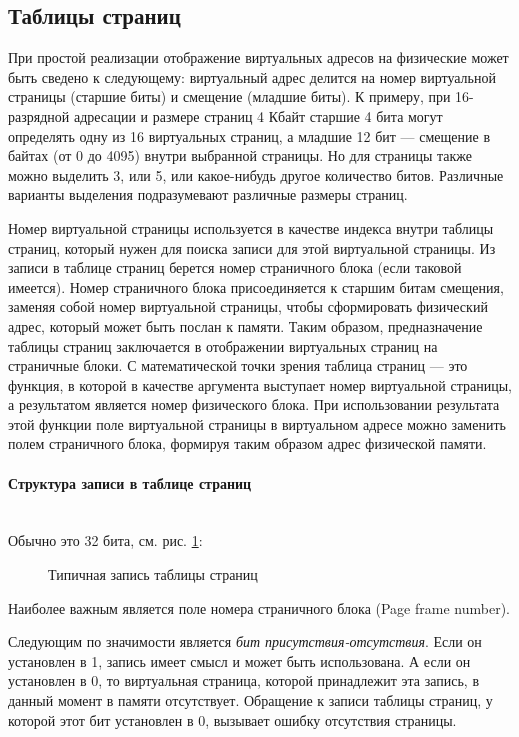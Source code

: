 \documentclass[12pt]{article}
\begin{document}
\subsection*{Таблицы страниц}
При простой реализации отображение виртуальных адресов на физические может быть сведено к следующему:
виртуальный адрес делится на номер виртуальной страницы (старшие биты) и смещение (младшие биты).
К примеру, при 16-разрядной адресации и размере страниц 4 Кбайт старшие 4 бита могут определять одну из 16 
виртуальных страниц, а младшие 12 бит — смещение в байтах (от 0 до 4095) внутри выбранной страницы. 
Но для страницы также можно выделить 3, или 5, или какое-нибудь другое количество битов. 
Различные варианты выделения подразумевают различные размеры страниц.

Номер виртуальной страницы используется в качестве индекса внутри таблицы страниц, 
который нужен для поиска записи для этой виртуальной страницы. 
Из записи в таблице страниц берется номер страничного блока (если таковой имеется). 
Номер страничного блока присоединяется к старшим битам смещения, заменяя собой номер виртуальной страницы, 
чтобы сформировать физический адрес, который может быть послан к памяти.
Таким образом, предназначение таблицы страниц заключается в отображении виртуальных страниц на страничные блоки. 
С математической точки зрения таблица страниц — это функция, в которой в качестве аргумента выступает 
номер виртуальной страницы, а результатом является номер физического блока. 
При использовании результата этой функции поле виртуальной страницы в виртуальном адресе можно заменить 
полем страничного блока, формируя таким образом адрес физической памяти.

\paragraph*{Структура записи в таблице страниц}
~\\
Обычно это 32 бита, см. рис. \ref{ris:page_table}:
\begin{figure}[h]
\caption{Типичная запись таблицы страниц}
\label{ris:page_table}
\end{figure}

Наиболее важным является поле номера страничного блока (Page frame number).

Следующим по значимости является \emph{бит присутствия-отсутствия}. Если он установлен в 1, 
запись имеет смысл и может быть использована. А если он установлен в 0, то виртуальная страница, 
которой принадлежит эта запись, в данный момент в памяти отсутствует. Обращение к записи таблицы страниц,
у которой этот бит установлен в 0, вызывает ошибку отсутствия страницы.
\end{document}
